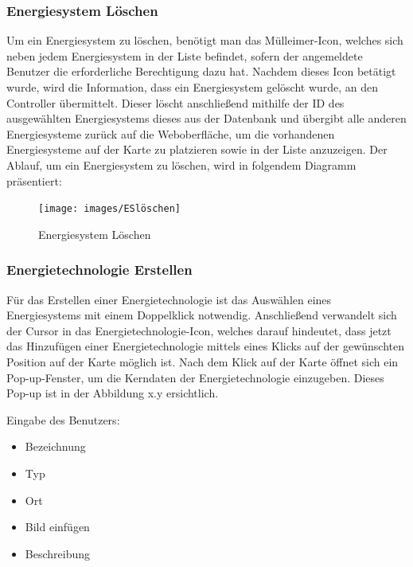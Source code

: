 \subsubsection{Energiesystem Löschen}
Um ein Energiesystem zu löschen, benötigt man das Mülleimer-Icon, welches sich neben jedem Energiesystem in der Liste befindet, sofern der angemeldete Benutzer die erforderliche Berechtigung dazu hat. 
Nachdem dieses Icon betätigt wurde, wird die Information, dass ein Energiesystem gelöscht wurde, an den Controller übermittelt. Dieser löscht anschließend mithilfe der ID des ausgewählten Energiesystems dieses aus der Datenbank und übergibt alle anderen Energiesysteme zurück auf die Weboberfläche, um die vorhandenen Energiesysteme auf der Karte zu platzieren sowie in der Liste anzuzeigen. Der Ablauf, um ein Energiesystem zu löschen, wird in folgendem Diagramm präsentiert:
\newline
\begin{figure}[h]
	\centering
	\texttt{[image: images/ESlöschen]}
	\caption{Energiesystem Löschen}
	\label{fig:CSS_System}
\end{figure}

\newpage
\subsubsection{Energietechnologie Erstellen}
Für das Erstellen einer Energietechnologie ist das Auswählen eines Energiesystems mit einem Doppelklick notwendig. Anschließend verwandelt sich der Cursor in das Energietechnologie-Icon, welches darauf hindeutet, dass jetzt das Hinzufügen einer Energietechnologie mittels eines Klicks auf der gewünschten Position auf der Karte möglich ist. Nach dem Klick auf der Karte öffnet sich ein Pop-up-Fenster, um die Kerndaten der Energietechnologie einzugeben. Dieses Pop-up ist in der Abbildung x.y ersichtlich. 



Eingabe des Benutzers:
\begin{itemize}
	\item Bezeichnung 
	\item Typ
	\item Ort
	\item Bild einfügen
	\item Beschreibung
\end{itemize}

